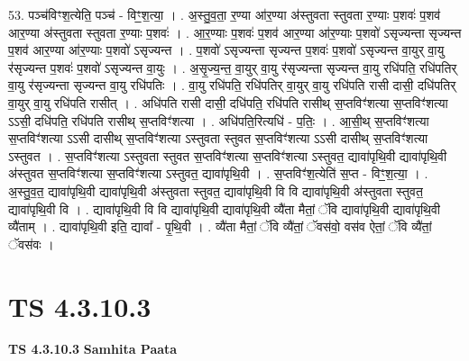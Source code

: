 \documentclass[17pt]{extarticle}
\begin{document}
53. पञ्च॑विꣳश॒त्येति॒ पञ्च॑ - विꣳ॒॒श॒त्या॒ । . अ॒स्तु॒व॒ता॒ र॒ण्या आ॑र॒ण्या अ॑स्तुवता स्तुवता र॒ण्याः प॒शवः॑ प॒शव॑ आर॒ण्या अ॑स्तुवता स्तुवता र॒ण्याः प॒शवः॑ । . आ॒र॒ण्याः प॒शवः॑ प॒शव॑ आर॒ण्या आ॑र॒ण्याः प॒शवो॑ ऽसृज्यन्ता सृज्यन्त प॒शव॑ आर॒ण्या आ॑र॒ण्याः प॒शवो॑ ऽसृज्यन्त । . प॒शवो॑ ऽसृज्यन्ता सृज्यन्त प॒शवः॑ प॒शवो॑ ऽसृज्यन्त वा॒युर् वा॒यु र॑सृज्यन्त प॒शवः॑ प॒शवो॑ ऽसृज्यन्त वा॒युः । . अ॒सृ॒ज्य॒न्त॒ वा॒युर् वा॒यु र॑सृज्यन्ता सृज्यन्त वा॒यु रधि॑पति॒ रधि॑पतिर् वा॒यु र॑सृज्यन्ता सृज्यन्त वा॒यु रधि॑पतिः । . वा॒यु रधि॑पति॒ रधि॑पतिर् वा॒युर् वा॒यु रधि॑पति रासी दासी॒ दधि॑पतिर् वा॒युर् वा॒यु रधि॑पति रासीत् । . अधि॑पति रासी दासी॒ दधि॑पति॒ रधि॑पति रासीथ् स॒प्तविꣳ॑शत्या स॒प्तविꣳ॑शत्या ऽऽसी॒ दधि॑पति॒ रधि॑पति रासीथ् स॒प्तविꣳ॑शत्या । . अधि॑पति॒रित्यधि॑ - प॒तिः॒ । . आ॒सी॒थ् स॒प्तविꣳ॑शत्या स॒प्तविꣳ॑शत्या ऽऽसी दासीथ् स॒प्तविꣳ॑शत्या ऽस्तुवता स्तुवत स॒प्तविꣳ॑शत्या ऽऽसी दासीथ् स॒प्तविꣳ॑शत्या ऽस्तुवत । . स॒प्तविꣳ॑शत्या ऽस्तुवता स्तुवत स॒प्तविꣳ॑शत्या स॒प्तविꣳ॑शत्या ऽस्तुवत॒ द्यावा॑पृथि॒वी द्यावा॑पृथि॒वी अ॑स्तुवत स॒प्तविꣳ॑शत्या स॒प्तविꣳ॑शत्या ऽस्तुवत॒ द्यावा॑पृथि॒वी । . स॒प्तविꣳ॑श॒त्येति॑ स॒प्त - विꣳ॒॒श॒त्या॒ । . अ॒स्तु॒व॒त॒ द्यावा॑पृथि॒वी द्यावा॑पृथि॒वी अ॑स्तुवता स्तुवत॒ द्यावा॑पृथि॒वी वि वि द्यावा॑पृथि॒वी अ॑स्तुवता स्तुवत॒ द्यावा॑पृथि॒वी वि । . द्यावा॑पृथि॒वी वि वि द्यावा॑पृथि॒वी द्यावा॑पृथि॒वी व्यै॑ता मैतां॒ ॅवि द्यावा॑पृथि॒वी द्यावा॑पृथि॒वी व्यै॑ताम् । . द्यावा॑पृथि॒वी इति॒ द्यावा᳚ - पृ॒थि॒वी । . व्यै॑ता मैतां॒ ॅवि व्यै॑तां॒ ॅवस॑वो॒ वस॑व ऐतां॒ ॅवि व्यै॑तां॒ ॅवस॑वः । \newline
\pagebreak
{}

\section{ TS 4.3.10.3 }

\textbf{TS 4.3.10.3 } \newline
\textbf{Samhita Paata} \newline
\end{document}
